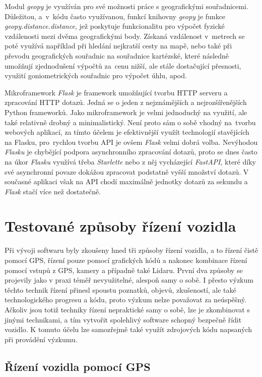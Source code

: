 \documentclass[czech, bachelor]{diploma}
\begin{document}
Modul \emph{geopy} je využíván pro své možnosti práce s geografickými souřadnicemi. Důležitou, a~v~kódu často využívanou, funkcí
knihovny \emph{geopy} je funkce \emph{geopy.distance.distance}, jež poskytuje funkcionalitu pro výpočet fyzické vzdálenosti mezi
dvěma geografickými body. Získaná vzdálenost v~metrech se poté využívá například při hledání nejkratší cesty na mapě, nebo také
při převodu geografických souřadnic na souřadnice kartézské, které následně umožňují zjednodušení výpočtů za~cenu nižší, ale stále
dostačující přesnosti, využití goniometrických souřadnic pro výpočet úhlu, apod.

Mikroframework \emph{Flask} je framework umožňující tvorbu HTTP serveru a zpracování HTTP dotazů. Jedná se o jeden z nejznámějších
a nejrozšířenějších Python frameworků. Jako mikroframework je velmi jednoduchý na využití, ale také relativně drobný
a minimalistický. Není proto sám o sobě vhodný na~tvorbu webových aplikací, za tímto účelem je efektivnější využít technologií
stavějících na Flasku, pro~rychlou tvorbu API je ovšem \emph{Flask} velmi dobrá volba. Nevýhodou \emph{Flasku} je chybějící
podpora asynchronního zpracování dotazů, proto se dnes často na úkor \emph{Flasku} využívá třeba \emph{Starlette} nebo z něj
vycházející \emph{FastAPI}, které díky své asynchronní povaze dokážou zpracovat podstatně vyšší množství dotazů. V současné
aplikaci však na API chodí maximálně jednotky dotazů za sekundu a \emph{Flask} stačí více než dostatečně.

\chapter{Testované způsoby řízení vozidla} \label{driving-methods}

Při vývoji softwaru byly zkoušeny hned tři způsoby řízení vozidla, a to řízení čistě pomocí GPS, řízení pouze pomocí grafických
kódů a nakonec kombinace řízení pomocí vstupů z GPS, kamery a případně také Lidaru. První dva způsoby se projevily jako v praxi
téměř nevyužitelné, alespoň samy o sobě. I přesto výzkum těchto technik řízení přinesl spoustu poznatků, objevů, zkušeností, ale
také technologického progresu a kódu, proto výzkum nelze považovat za neúspěšný. Ačkoliv jsou totiž techniky řízení nepraktické
samy o sobě, lze je zkombinovat s jinými technikami, a tím vytvořit spolehlivý software schopný bezpečně řídit vozidlo. K tomuto
účelu lze samozřejmě také využít zdrojových kódu napsaných při provádění výzkumu.

\section{Řízení vozidla pomocí GPS} \label{gps-failure}
\end{document}
